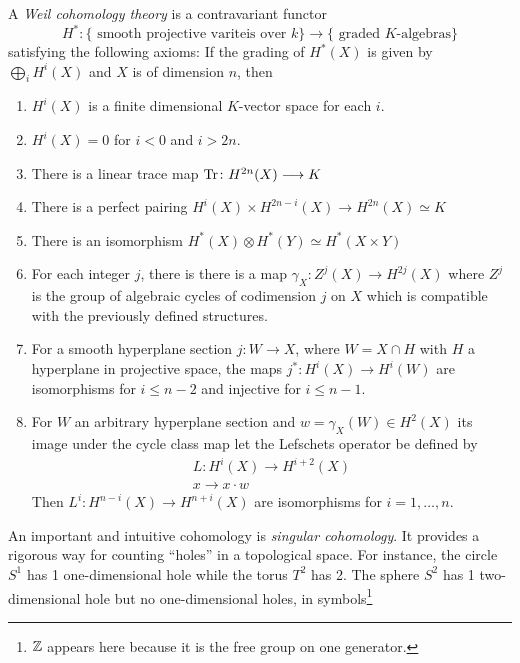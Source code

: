 \begin{definition}
	A \textit{Weil cohomology theory} is a contravariant functor
	\[H^* \colon \{ \text{ smooth projective variteis over } k \} \to \{\text{ graded $K$-algebras}\}\]
	satisfying the following axioms: If the grading of $H^*(X)$ is given by $\bigoplus_i H^i(X)$ and $X$ is of dimension $n$, then
	\begin{enumerate}
		\item $H^i(X)$ is a finite dimensional $K$-vector space for each $i$.
		\item $H^i(X) = 0$ for $i<0$ and $i>2n$.
		\item There is a linear trace map $\operatorname{Tr} \colon H^{2n}(X) \longrightarrow K$
		\item There is a perfect pairing $H^i(X) \times H^{2n-i}(X) \to H^{2n}(X) \simeq K$
		\item There is an isomorphism $H^*(X) \otimes H^*(Y) \simeq H^*(X \times Y)$
		\item For each integer $j$, there is there is a map $\gamma_X \colon Z^j(X) \to H^{2j}(X)$ where $Z^j$ is the group of algebraic cycles of codimension $j$ on $X$ which is compatible with the previously defined structures.
		\item For a smooth hyperplane section $j \colon W \to X$, where $W = X \cap H$ with $H$ a hyperplane in projective space, the maps $j^* \colon H^i (X) \to H^i(W)$ are isomorphisms for $i \le n-2$ and injective for $i \le n-1$.
		\item For $W$ an arbitrary hyperplane section and $w = \gamma_X(W) \in H^2(X)$ its image under the cycle class map let the Lefschets operator be defined by
		      \begin{gather*}
			      L \colon H^i(X) \to H^{i+2}(X)\\
			      x \to x \cdot w
		      \end{gather*}
		      Then $L^i \colon H^{n-i}(X) \to H^{n+i}(X)$ are isomorphisms for $i = {1, \dots, n}$.
	\end{enumerate}
\end{definition}

An important and intuitive cohomology is \textit{singular cohomology}. It provides a rigorous way for counting ``holes'' in a topological space. For instance, the circle $S^1$ has 1 one-dimensional hole while the torus $T^2$ has 2. The sphere $S^2$ has 1 two-dimensional hole but no one-dimensional holes, in symbols\footnote{$\mathbb{Z}$ appears here because it is the free group on one generator.}

